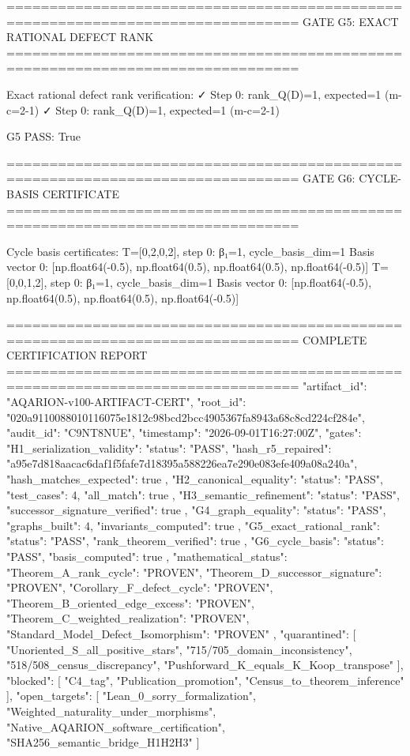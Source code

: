 ================================================================================
GATE G5: EXACT RATIONAL DEFECT RANK
================================================================================

  Exact rational defect rank verification:
    ✓ Step 0: rank_Q(D)=1, expected=1 (m-c=2-1)
    ✓ Step 0: rank_Q(D)=1, expected=1 (m-c=2-1)

  G5 PASS: True

================================================================================
GATE G6: CYCLE-BASIS CERTIFICATE
================================================================================

  Cycle basis certificates:
    T=[0,2,0,2], step 0: β₁=1, cycle_basis_dim=1
      Basis vector 0: [np.float64(-0.5), np.float64(0.5), np.float64(0.5), np.float64(-0.5)]
    T=[0,0,1,2], step 0: β₁=1, cycle_basis_dim=1
      Basis vector 0: [np.float64(-0.5), np.float64(0.5), np.float64(0.5), np.float64(-0.5)]

================================================================================
COMPLETE CERTIFICATION REPORT
================================================================================
{
  "artifact_id": "AQARION-v100-ARTIFACT-CERT",
  "root_id": "020a9110088010116075e1812c98bcd2bcc4905367fa8943a68c8cd224cf284e",
  "audit_id": "C9NT8NUE",
  "timestamp": "2026-09-01T16:27:00Z",
  "gates": {
    "H1_serialization_validity": {
      "status": "PASS",
      "hash_r5_repaired": "a95e7d818aacac6daf1f5fafe7d18395a588226ea7e290e083efe409a08a240a",
      "hash_matches_expected": true
    },
    "H2_canonical_equality": {
      "status": "PASS",
      "test_cases": 4,
      "all_match": true
    },
    "H3_semantic_refinement": {
      "status": "PASS",
      "successor_signature_verified": true
    },
    "G4_graph_equality": {
      "status": "PASS",
      "graphs_built": 4,
      "invariants_computed": true
    },
    "G5_exact_rational_rank": {
      "status": "PASS",
      "rank_theorem_verified": true
    },
    "G6_cycle_basis": {
      "status": "PASS",
      "basis_computed": true
    }
  },
  "mathematical_status": {
    "Theorem_A_rank_cycle": "PROVEN",
    "Theorem_D_successor_signature": "PROVEN",
    "Corollary_F_defect_cycle": "PROVEN",
    "Theorem_B_oriented_edge_excess": "PROVEN",
    "Theorem_C_weighted_realization": "PROVEN",
    "Standard_Model_Defect_Isomorphism": "PROVEN"
  },
  "quarantined": [
    "Unoriented_S_all_positive_stars",
    "715/705_domain_inconsistency",
    "518/508_census_discrepancy",
    "Pushforward_K_equals_K_Koop_transpose"
  ],
  "blocked": [
    "C4_tag",
    "Publication_promotion",
    "Census_to_theorem_inference"
  ],
  "open_targets": [
    "Lean_0_sorry_formalization",
    "Weighted_naturality_under_morphisms",
    "Native_AQARION_software_certification",
    "SHA256_semantic_bridge_H1H2H3"
  ]
}

